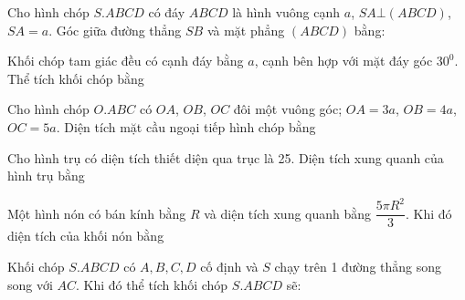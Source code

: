 \documentclass[12pt]{article}
\begin{document}
\begin{vnmultiplechoice}[keycolumns=3]
\begin{question}%
Cho hình chóp $S.ABCD$ có đáy $ABCD$ là hình vuông cạnh $a$, $SA \bot (ABCD)$, $SA= a$. Góc giữa đường thẳng $SB$ và mặt phẳng $(ABCD)$ bằng:
\vspace{0.2cm}
\datcot
\bonpa
{}
{}
{}
{}
\end{question}

\begin{question}%
Khối chóp tam giác đều có cạnh đáy bằng $a$, cạnh bên hợp với mặt đáy góc $30^0$. Thể tích khối chóp bằng
\vspace{0.2cm}
\datcot
\bonpa
{}
{}
{}
{}
\end{question}

\begin{question}%
Cho hình chóp $O.ABC$ có $OA$, $OB$, $OC$ đôi một vuông góc; $OA=3a$, $OB=4a$, $OC=5a$. Diện tích mặt cầu ngoại tiếp hình chóp bằng
\vspace{0.2cm}
\datcot
\bonpa
{}
{}
{}
{}
\end{question}

\begin{question}%
Cho hình trụ có diện tích thiết diện qua trục là 25. Diện tích xung quanh của hình trụ bằng
\vspace{0.2cm}
\datcot
\bonpa
{}
{}
{}
{}
\end{question}

\begin{question}%
Một hình nón có bán kính bằng $R$ và diện tích xung quanh bằng $\dfrac{5\pi R^2}{3}$. Khi đó diện tích của khối nón bằng
\vspace{0.2cm}
\datcot
\bonpa
{}
{}
{}
{}
\end{question}

\begin{question}%
Khối chóp $S.ABCD$ có $A, B, C, D$ cố định và $S$ chạy trên 1 đường thẳng song song với $AC$. Khi đó thể tích khối chóp $S.ABCD$ sẽ:
\vspace{0.2cm}
\datcot
\bonpa
{}
{}
{}
{}
\end{question}


\end{vnmultiplechoice}
\end{document}
